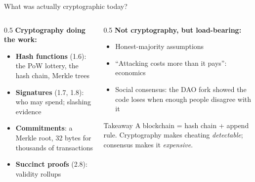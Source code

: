 \ifdefined\PRESENTATION\else\PassOptionsToClass{handout}{beamer}\fi\documentclass[aspectratio=169, lualatex]{beamer}
\begin{document}
\begin{frame}{What was actually cryptographic today?}
	\begin{columns}[c]
		\begin{column}{0.5\textwidth}
			\textbf{Cryptography doing the work:}
			\begin{itemize}
				\item \textbf{Hash functions} (1.6): the PoW lottery, the hash chain, Merkle trees
				\item \textbf{Signatures} (1.7, 1.8): who may spend; slashing evidence
				\item \textbf{Commitments}: a Merkle root, 32 bytes for thousands of transactions
				\item \textbf{Succinct proofs} (2.8): validity rollups
			\end{itemize}
		\end{column}
		\begin{column}{0.5\textwidth}
			\textbf{Not cryptography, but load-bearing:}
			\begin{itemize}
				\item Honest-majority assumptions
				\item ``Attacking costs more than it pays'': economics
				\item Social consensus: the DAO fork showed the code loses when enough people disagree with it
			\end{itemize}
			\begin{alertblock}{Takeaway}
				A blockchain = hash chain + append rule. Cryptography makes cheating \emph{detectable}; consensus makes it \emph{expensive}.
			\end{alertblock}
		\end{column}
	\end{columns}
\end{frame}

\begin{frame}[plain]
	\titlepage
\end{frame}
\end{document}
